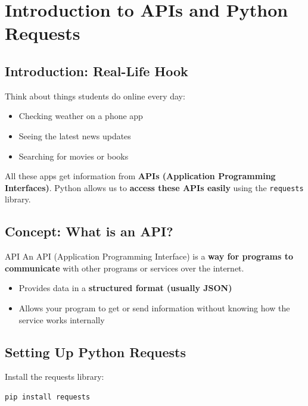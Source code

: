\chapter{Introduction to APIs and Python Requests}

\section{Introduction: Real-Life Hook}

Think about things students do online every day:

\begin{itemize}
    \item Checking weather on a phone app  
    \item Seeing the latest news updates  
    \item Searching for movies or books  
\end{itemize}

All these apps get information from \textbf{APIs (Application Programming Interfaces)}. Python allows us to \textbf{access these APIs easily} using the \texttt{requests} library.

\section{Concept: What is an API?}

\begin{definition}{API}
An API (Application Programming Interface) is a \textbf{way for programs to communicate} with other programs or services over the internet.
\end{definition}

\begin{itemize}
    \item Provides data in a \textbf{structured format (usually JSON)}  
    \item Allows your program to get or send information without knowing how the service works internally  
\end{itemize}

\section{Setting Up Python Requests}

Install the requests library:

\begin{verbatim}
pip install requests
\end{verbatim}

